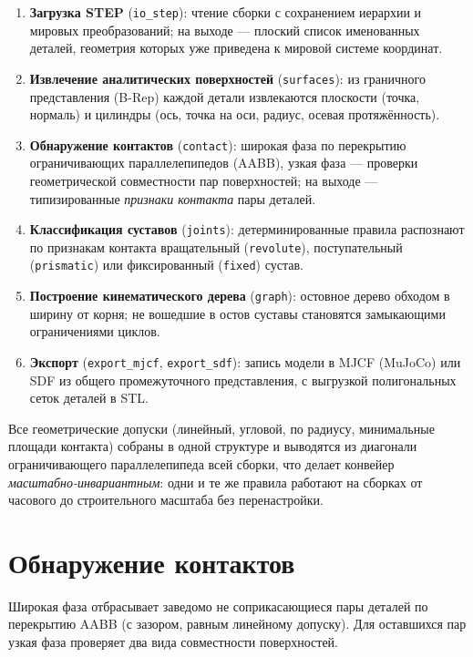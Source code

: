 \begin{enumerate}
  \item \textbf{Загрузка STEP} (\texttt{io\_step}): чтение сборки с сохранением
        иерархии и мировых преобразований; на выходе --- плоский список
        именованных деталей, геометрия которых уже приведена к мировой системе
        координат.
  \item \textbf{Извлечение аналитических поверхностей} (\texttt{surfaces}): из
        граничного представления (B-Rep) каждой детали извлекаются плоскости
        (точка, нормаль) и цилиндры (ось, точка на оси, радиус, осевая
        протяжённость).
  \item \textbf{Обнаружение контактов} (\texttt{contact}): широкая фаза по
        перекрытию ограничивающих параллелепипедов (AABB), узкая фаза ---
        проверки геометрической совместности пар поверхностей; на выходе ---
        типизированные \emph{признаки контакта} пары деталей.
  \item \textbf{Классификация суставов} (\texttt{joints}): детерминированные
        правила распознают по признакам контакта вращательный
        (\texttt{revolute}), поступательный (\texttt{prismatic}) или
        фиксированный (\texttt{fixed}) сустав.
  \item \textbf{Построение кинематического дерева} (\texttt{graph}): остовное
        дерево обходом в ширину от корня; не вошедшие в остов суставы
        становятся замыкающими ограничениями циклов.
  \item \textbf{Экспорт} (\texttt{export\_mjcf}, \texttt{export\_sdf}): запись
        модели в MJCF (MuJoCo) или SDF из общего промежуточного представления,
        с выгрузкой полигональных сеток деталей в STL.
\end{enumerate}

Все геометрические допуски (линейный, угловой, по радиусу, минимальные площади
контакта) собраны в одной структуре и выводятся из диагонали ограничивающего
параллелепипеда всей сборки, что делает конвейер \emph{масштабно-инвариантным}:
одни и те же правила работают на сборках от часового до строительного масштаба
без перенастройки.

\section{Обнаружение контактов}

Широкая фаза отбрасывает заведомо не соприкасающиеся пары деталей по перекрытию
AABB (с зазором, равным линейному допуску). Для оставшихся пар узкая фаза
проверяет два вида совместности поверхностей.

